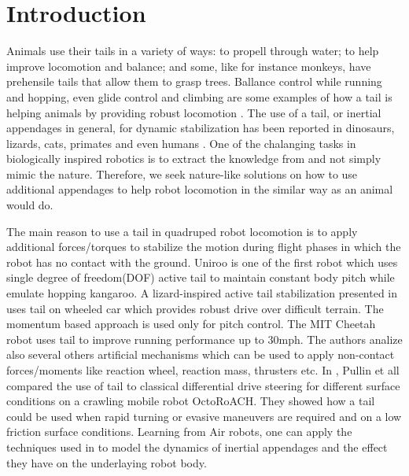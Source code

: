 \section{Introduction}\label{sec:introduction}

Animals use their tails in a variety of ways: to propell through water; to help improve locomotion and balance; and some, like for instance monkeys, have prehensile tails that allow them to grasp trees. Ballance control while running and hopping, even glide control and climbing are some examples of how a tail is helping animals by providing robust locomotion \cite{Thomas:Nature2012}. The use of a tail, or inertial appendages in general, for dynamic stabilization has been reported in dinosaurs, lizards, cats, primates and even humans \cite{ostrom1969osteology,PijnappelsSringer,Walker199841,JusufiIOP2010}. One of the chalanging tasks in biologically inspired robotics is to extract the knowledge from and not simply mimic the nature. Therefore, we seek nature-like solutions on how to use additional appendages to help robot locomotion in the similar way as an animal would do.  

The main reason to use a tail in quadruped robot locomotion is to apply additional forces/torques to stabilize the motion during flight phases in which the robot has no contact with the ground. Uniroo \cite{zeglin1991uniroo} is one of the first robot which uses single degree of freedom(DOF) active tail to maintain constant body pitch while emulate hopping kangaroo. A lizard-inspired active tail stabilization presented in \cite{conf/iros/Chang-SiuLTF11} uses tail on wheeled car which provides robust drive over difficult terrain. The momentum based approach is used only for pitch control. The MIT Cheetah robot \cite{DBLP:conf/iros/BriggsLHK12} uses tail to improve running performance up to 30mph. The authors analize also several others artificial mechanisms which can be used to apply non-contact forces/moments like reaction wheel, reaction mass, thrusters etc. In \cite{PullinICRA12}, Pullin et all compared the use of tail to classical differential drive steering for different surface conditions on a crawling mobile robot OctoRoACH. They showed how a tail could be used when rapid turning or evasive maneuvers are required and on a low friction surface conditions. Learning from Air robots, one can apply the techniques used in \cite{Korpela2013ICRA,Orsag2012JINT} to model the dynamics of inertial appendages and the effect they have on the underlaying robot body.

